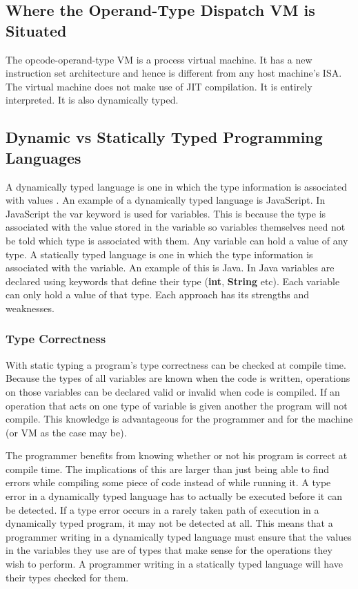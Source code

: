 \documentclass[english,a4paper]{article}
\begin{document}
\subsection{Where the Operand-Type Dispatch VM is Situated}
The opcode-operand-type VM is a process virtual machine. It has a new
instruction set architecture and hence is different from any host
machine's ISA. The virtual machine does not make use of JIT
compilation. It is entirely interpreted. It is also dynamically typed.

\subsection{Dynamic vs Statically Typed Programming Languages}
A dynamically typed language is one in which the type information is
associated with values \cite[pg4]{RobertoIerusalimschy}. An example of
a dynamically typed language is JavaScript. In JavaScript the var
keyword is used for variables. This is because the type is associated
with the value stored in the variable so variables themselves need not
be told which type is associated with them. Any variable can hold a
value of any type. A statically typed language is one in which the
type information is associated with the variable. An example of this
is Java. In Java variables are declared using keywords that define
their type (\textbf{int}, \textbf{String} etc). Each variable can only
hold a value of that type. Each approach has its strengths and
weaknesses.

\subsubsection{Type Correctness}
With static typing a program's type correctness can be checked at
compile time. Because the types of all variables are known when the
code is written, operations on those variables can be declared valid
or invalid when code is compiled. If an operation that acts on one
type of variable is given another the program will not compile. This
knowledge is advantageous for the programmer and for the machine (or
VM as the case may be).

The programmer benefits from knowing whether or not his program is
correct at compile time. The implications of this are larger than just
being able to find errors while compiling some piece of code instead
of while running it. A type error in a dynamically typed language has
to actually be executed before it can be detected. If a type error
occurs in a rarely taken path of execution in a dynamically typed
program, it may not be detected at all. This means that a programmer
writing in a dynamically typed language must ensure that the values in
the variables they use are of types that make sense for the operations
they wish to perform. A programmer writing in a statically typed
language will have their types checked for them.
\end{document}
